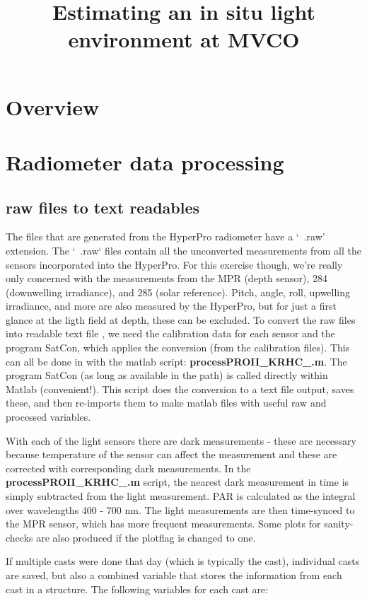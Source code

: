 \documentclass[11pt]{article}
\title{Estimating an in situ light environment at MVCO}
\begin{document}
\maketitle
\section{Overview}
\section{Radiometer data processing}
\subsection{raw files to text readables}
The files that are generated from the HyperPro radiometer have a `~.raw' extension. The `~.raw` files contain all the unconverted measurements from all the sensors incorporated into the HyperPro. For this exercise though, we're really only concerned with the measurements from the MPR (depth sensor), 284 (downwelling irradiance), and 285 (solar reference). Pitch, angle, roll, upwelling irradiance, and more are also measured by the HyperPro, but for just a first glance at the ligth field at depth, these can be excluded. To convert the raw files into readable text file , we need the calibration data for each sensor and the program SatCon, which applies the conversion (from the calibration files). This can all be done in with the matlab script: \textbf{processPROII\_KRHC\_.m}. The program SatCon (as long as available in the path) is called directly within Matlab (convenient!). This script does the conversion to a text file output, saves these, and then re-imports them to make matlab files with useful raw and processed variables.

With each of the light sensors there are dark measurements - these are necessary because temperature of the sensor can affect the measurement and these are corrected with corresponding dark measurements. In the \textbf{processPROII\_KRHC\_.m} script, the nearest dark measurement in time is simply subtracted from the light measurement. PAR is calculated as the integral over wavelengths 400 - 700 nm. The light measurements are then time-synced to the MPR sensor, which has more frequent measurements. Some plots for sanity-checks are also produced if the plotflag is changed to one.

If multiple casts were done that day (which is typically the cast), individual casts are saved, but also a combined variable that stores the information from each cast in a structure. The following variables for each cast are:
\end{document}

